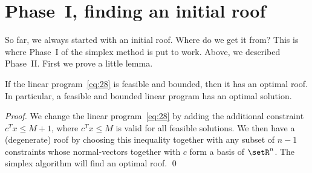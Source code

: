 



  \section{Phase~I, finding an initial roof}
  \label{sec:phase-i-finding}


  So far, we always started with an initial roof. Where do we get 
  it  from?  This is where Phase~I of the simplex method is put to
  work. Above, we described Phase~II.   First we prove a little lemma. 
  
  \begin{lemma}
    \label{lem:3}
    If the linear program~\eqref{eq:28} is feasible and bounded, then
    it has an optimal roof. In particular, a feasible and bounded
    linear program has an optimal solution.
  \end{lemma}
  
  \begin{proof}
    We change the linear program~\eqref{eq:28} by adding the
    additional constraint $c^Tx \leq M+1$, where $c^Tx\leq M$ is valid for
    all feasible solutions. We then have a (degenerate) roof by
    choosing this inequality together with any subset of   $n-1$
    constraints whose normal-vectors together with $c$ form a basis of
    $\setR^n$. The     simplex algorithm will find an optimal roof. \qed 
  \end{proof}


